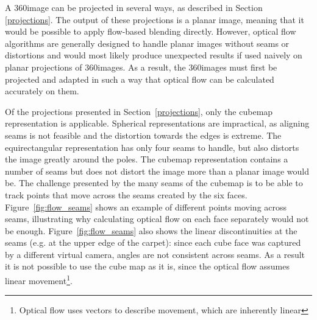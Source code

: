 A 360\degree image can be projected in several ways, as described in Section \ref{projections}. The output of these projections is a planar image, meaning that it would be possible to apply flow-based blending directly. However, optical flow algorithms are generally designed to handle planar images without seams or distortions and would most likely produce unexpected results if used naively on planar projections of 360\degree images. As a result, the 360\degree images must first be projected and adapted in such a way that optical flow can be calculated accurately on them.


Of the projections presented in Section~\ref{projections}, only the cubemap representation is applicable. Spherical representations are impractical, as aligning seams is not feasible and the distortion towards the edges is extreme. The equirectangular representation has only four seams to handle, but also distorts the image greatly around the poles. The cubemap representation contains a number of seams but does not distort the image more than a planar image would be. 
The challenge presented by the many seams of the cubemap is to be able to track points that move across the seams created by the six faces. Figure~\ref{fig:flow_seams} shows an example of different points moving across seams, illustrating why calculating optical flow on each face separately would not be enough. Figure~\ref{fig:flow_seams} also shows the linear discontinuities at the seams (e.g. at the upper edge of the carpet): since each cube face was captured by a different virtual camera, angles are not consistent across seams. As a result it is not possible to use the cube map as it is, since the optical flow assumes linear movement\footnote{Optical flow uses vectors to describe movement, which are inherently linear}.


